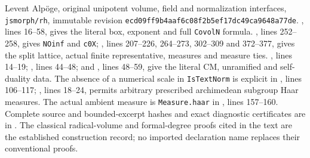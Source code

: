 Levent Alp\"oge, original unipotent volume, field and normalization
interfaces, \texttt{jsmorph/rh}, immutable revision
\texttt{ecd09ff9b4aaf6c08f2b5ef17dc49ca9648a77de}.
,
lines 16--58, gives the literal box, exponent and full
\texttt{CovolN} formula.
, lines 252--258, gives
\texttt{NOinf} and \texttt{c0X};
, lines 207--226, 264--273,
302--309 and 372--377, gives the split lattice, actual finite
representative, measures and measure ties.
, lines 14--19;
, lines 44--48;
and ,
lines 48--59, give the literal CM, unramified and self-duality data.
The absence of a numerical scale in \texttt{IsTextNorm} is
explicit in , lines 106--117;
, lines 18--24,
permits arbitrary prescribed archimedean subgroup Haar measures.
The actual ambient measure is \texttt{Measure.haar} in
, lines 157--160.
Complete source and bounded-excerpt hashes and exact diagnostic
certificates are in
.
The classical radical-volume and formal-degree proofs cited in
the text are the established construction record; no imported
declaration name replaces their conventional proofs.
